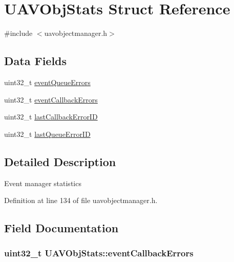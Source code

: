 \hypertarget{struct_u_a_v_obj_stats}{\section{\-U\-A\-V\-Obj\-Stats \-Struct \-Reference}
\label{struct_u_a_v_obj_stats}
}


{\ttfamily \#include $<$uavobjectmanager.\-h$>$}

\subsection*{\-Data \-Fields}
\begin{DoxyCompactItemize}
\item 
uint32\-\_\-t \hyperlink{struct_u_a_v_obj_stats_a0dc695f48120e441e86ad99fe656627a}{event\-Queue\-Errors}
\item 
uint32\-\_\-t \hyperlink{struct_u_a_v_obj_stats_a089a0df0362c3cb4e7cd4c61005ac105}{event\-Callback\-Errors}
\item 
uint32\-\_\-t \hyperlink{struct_u_a_v_obj_stats_ac3961ffa474982b4c8678fcfd240476f}{last\-Callback\-Error\-I\-D}
\item 
uint32\-\_\-t \hyperlink{struct_u_a_v_obj_stats_a7ad7134bdc6a7f7807b8387a71f507a0}{last\-Queue\-Error\-I\-D}
\end{DoxyCompactItemize}


\subsection{\-Detailed \-Description}
\-Event manager statistics 

\-Definition at line 134 of file uavobjectmanager.\-h.



\subsection{\-Field \-Documentation}
\hypertarget{struct_u_a_v_obj_stats_a089a0df0362c3cb4e7cd4c61005ac105}{
\subsubsection[{event\-Callback\-Errors}]{\setlength{\rightskip}{0pt plus 5cm}uint32\-\_\-t {\bf \-U\-A\-V\-Obj\-Stats\-::event\-Callback\-Errors}}}\label{struct_u_a_v_obj_stats_a089a0df0362c3cb4e7cd4c61005ac105}


